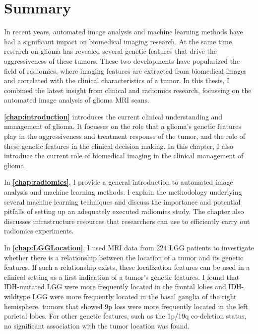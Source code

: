 \chapter{Summary}
\begin{ChapterAbstractNoTitle}
\end{ChapterAbstractNoTitle}

In recent years, automated image analysis and machine learning methods have had a significant impact on biomedical imaging research.
At the same time, research on glioma has revealed several genetic features that drive the aggressiveness of these \glspl{tumor}.
These two developments have popularized the field of radiomics, where imaging features are extracted from biomedical images and correlated with the clinical characteristics of a \gls{tumor}.
In this thesis, I combined the latest insight from clinical and radiomics research, focussing on the automated image analysis of glioma \gls{MRI} scans.

\textbf{\cref{chap:introduction}} introduces the current clinical understanding and management of glioma.
It focusses on the role that a glioma's genetic features play in the aggressiveness and treatment response of the \gls{tumor}, and the role of these genetic features in the clinical decision making.
In this chapter, I also introduce the current role of biomedical imaging in the clinical management of glioma.

In \textbf{\cref{chap:radiomics}}, I provide a general introduction to automated image analysis and machine learning methods.
I explain the methodology underlying several machine learning techniques and discuss the importance and potential pitfalls of setting up an adequately executed radiomics study.
The chapter also discusses infrastructure resources that researchers can use to efficiently carry out radiomics experiments.

In \textbf{\cref{chap:LGGLocation}}, I used MRI data from 224 \gls{LGG} patients to investigate whether there is a relationship between the location of a \gls{tumor} and its genetic features.
If such a relationship exists, these localization features can be used in a clinical setting as a first indication of a \gls{tumor}'s genetic features.
I found that \gls{IDH}-mutated \gls{LGG} were more frequently located in the frontal lobes and \gls{IDH}-wildtype \gls{LGG} were more frequently located in the basal ganglia of the right hemisphere.
\Glspl{tumor} that showed 9p loss were more frequently located in the left parietal lobes.
For other genetic features, such as the 1p/19q co-deletion status, no significant association with the \gls{tumor} location was found.


